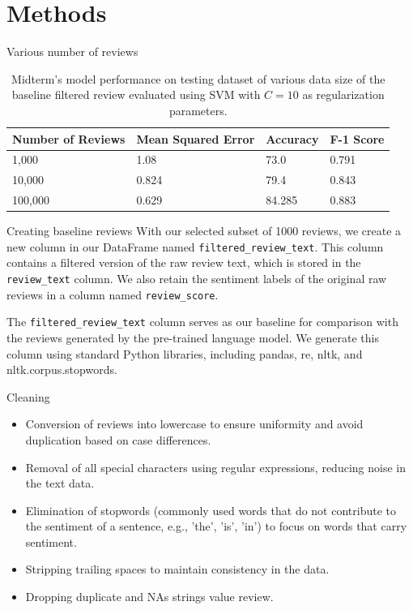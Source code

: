 \documentclass{beamer}
\begin{document}
\section{Methods}

\begin{frame}{Various number of reviews}
\begin{table}[h]
\centering
\begin{tabular}{llll}
\toprule
\textbf{Number of Reviews} & \textbf{Mean Squared Error} & \textbf{Accuracy} & \textbf{F-1 Score} \\
\midrule
1,000 & 1.08 & 73.0 & 0.791 \\
10,000 & 0.824 & 79.4 & 0.843 \\
100,000 & 0.629 & 84.285 & 0.883 \\
\bottomrule
\end{tabular}
\caption{Midterm's model performance on testing dataset of various data size of the baseline filtered review evaluated using SVM with $C=10$ as regularization parameters.}
\end{table}
\end{frame}

\begin{frame}{Creating baseline reviews}
With our selected subset of 1000 reviews, we create a new column in our DataFrame named \texttt{filtered\_review\_text}. This column contains a filtered version of the raw review text, which is stored in the \texttt{review\_text} column. We also retain the sentiment labels of the original raw reviews in a column named \texttt{review\_score}.

The \texttt{filtered\_review\_text} column serves as our baseline for comparison with the reviews generated by the pre-trained language model. We generate this column using standard Python libraries, including pandas, re, nltk, and nltk.corpus.stopwords.

    
\end{frame}

\begin{frame}{Cleaning}
\begin{itemize}
    \item Conversion of reviews into lowercase to ensure uniformity and avoid duplication based on case differences.
    \item Removal of all special characters using regular expressions, reducing noise in the text data.
    \item Elimination of stopwords (commonly used words that do not contribute to the sentiment of a sentence, e.g., 'the', 'is', 'in') to focus on words that carry sentiment.
    \item Stripping trailing spaces to maintain consistency in the data.
    \item Dropping duplicate and NAs strings value review.
\end{itemize}
    
\end{frame}
\end{document}
